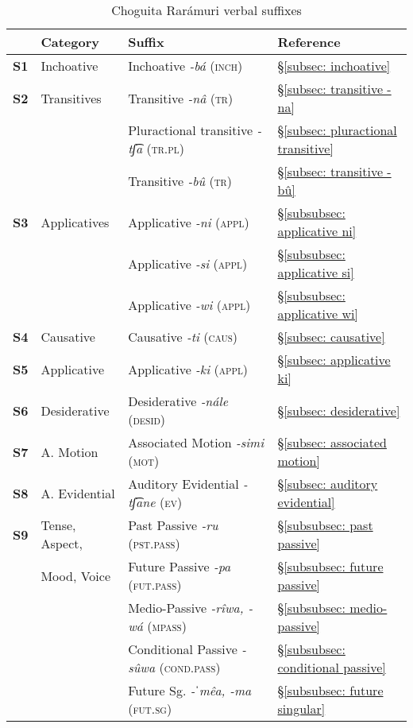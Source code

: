 \begin{table}
\caption{Choguita Rarámuri verbal suffixes}
\label{tab:key:15}
\small
\begin{tabularx}{\textwidth}{lp{}Ql}
\lsptoprule
& \textbf{Category} & \textbf{Suffix} & \textbf{Reference}\\
\midrule
 \textbf{S1} & Inchoative & Inchoative  \textit{-bá} (\textsc{inch}) & §\ref{subsec: inchoative}\\
 \textbf{S2} & Transitives & Transitive  \textit{-nâ} (\textsc{tr}) & §\ref{subsec: transitive -na}\\
 &  & Pluractional transitive  \textit{-tʃ͡a} (\textsc{tr.pl}) & §\ref{subsec: pluractional transitive}\\
 &  & Transitive  \textit{-bû} (\textsc{tr}) & §\ref{subsec: transitive -bû}\\
 \textbf{S3} & Applicatives & Applicative  \textit{-ni} (\textsc{appl}) & §\ref{subsubsec: applicative ni}\\
&  & Applicative  \textit{-si} (\textsc{appl}) & §\ref{subsubsec: applicative si}\\
&  & Applicative  \textit{-wi} (\textsc{appl}) & §\ref{subsubsec: applicative wi}\\
 \textbf{S4} & Causative & Causative  \textit{-ti} (\textsc{caus}) & §\ref{subsec: causative}\\
 \textbf{S5} & Applicative & Applicative  \textit{-ki} (\textsc{appl}) & §\ref{subsec: applicative ki}\\
 \textbf{S6} & Desiderative & Desiderative  \textit{-nále} (\textsc{desid}) & §\ref{subsec: desiderative}\\
 \textbf{S7} & A. Motion & Associated Motion  \textit{-simi} (\textsc{mot}) & §\ref{subsec: associated motion}\\
 \textbf{S8} & A. Evidential & Auditory Evidential  \textit{-tʃ͡ane} (\textsc{ev}) & §\ref{subsec: auditory evidential}\\
 \textbf{S9} & Tense, Aspect, & Past Passive  \textit{{}-ru} (\textsc{pst.pass}) & §\ref{subsubsec: past passive}\\
& Mood, Voice & Future Passive  \textit{{}-pa} (\textsc{fut.pass}) & §\ref{subsubsec: future passive}\\
&  & Medio-Passive  \textit{-rîwa, -wá} (\textsc{mpass}) & §\ref{subsubsec: medio-passive}\\
&  & Conditional Passive \textit{-sûwa} (\textsc{cond.pass}) & §\ref{subsubsec: conditional passive}\\
&  & Future Sg.  \textit{-ˈmêa, -ma} (\textsc{fut.sg}) & §\ref{subsubsec: future singular}\\

\end{tabularx}
\end{table}

